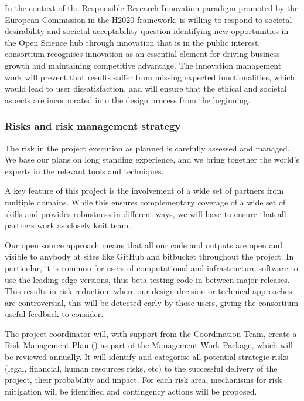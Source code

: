 In the context of the Responsible Research Innovation paradigm promoted by the European Commission in
the H2020 framework, \TheProject is willing to respond to societal desirability and societal acceptability
question identifying new opportunities in the Open Science hub through innovation that is in the public
interest. \TheProject consortium recognises innovation as an essential element for driving business growth
and maintaining competitive advantage. The innovation management work will prevent that \TheProject
results suffer from missing expected functionalities, which would lead to user dissatisfaction, and will
ensure that the ethical and societal aspects are incorporated into the design process from the beginning.

\subsubsection{Risks and risk management strategy}\label{sec:risks}

The risk in the project execution as planned is carefully assessed and
managed. We base our plans on long standing experience, and we bring
together the world's experts in the relevant tools and techniques.

A key feature of this project is the involvement of a wide set of
partners from multiple domains. While this ensures complementary
coverage of a wide set of skills and provides robustness in different
ways, we will have to ensure that all partners work as closely knit
team.

Our open source approach means that all our code and outputs
are open and visible to anybody at sites like GitHub and bitbucket
throughout the project. In particular, it is common for users of
computational and infrastructure software to use the leading edge versions, thus
beta-testing code in-between major releases. This results in risk
reduction: where our design decision or technical approaches are
controversial, this will be detected early by those users, giving the
consortium useful feedback to consider.

The project coordinator will, with support from the Coordination Team, create
a Risk Management Plan () as part of the Management
Work Package, which will be reviewed annually. It will identify and categorise all
potential strategic risks (legal, financial, human resources risks, etc)
to the successful delivery of the project, their probability and impact.
For each risk area, mechanisms for risk mitigation will be identified
and contingency actions will be proposed.

